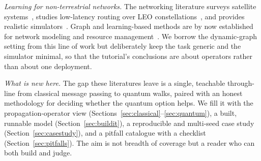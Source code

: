 \textit{Learning for non-terrestrial networks.} The networking literature surveys
satellite systems~\cite{kodheli2021ntn}, studies low-latency routing over LEO
constellations~\cite{handley2018delay}, and provides realistic
simulators~\cite{kassing2020hypatia}. Graph and learning-based methods are by now
established for network modeling and resource
management~\cite{rusek2020routenet,shen2021gnnradio,eisen2020optimal,mao2016resource}.
We borrow the dynamic-graph setting from this line of work but deliberately keep the
task generic and the simulator minimal, so that the tutorial's conclusions are about
operators rather than about one deployment.

\textit{What is new here.} The gap these literatures leave is a single, teachable
through-line from classical message passing to quantum walks, paired with an honest
methodology for deciding whether the quantum option helps. We fill it with the
propagation-operator view (Sections~\ref{sec:classical}--\ref{sec:quantum}), a built,
runnable model (Section~\ref{sec:buildit}), a reproducible and multi-seed case study
(Section~\ref{sec:casestudy}), and a pitfall catalogue with a checklist
(Section~\ref{sec:pitfalls}). The aim is not breadth of coverage but a reader who can
both build and judge.
